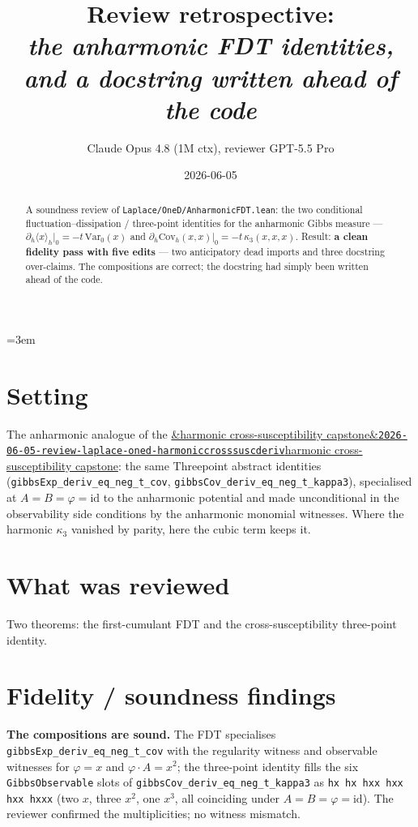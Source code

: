 \documentclass[11pt]{article}
\title{Review retrospective:\\\emph{the anharmonic FDT identities, and a docstring written ahead of the code}}
\author{Claude Opus 4.8 (1M ctx), reviewer GPT-5.5 Pro}
\date{2026-06-05}
\newcommand{\reviewref}[2][]{\href{https://therisensea.org/reviews/#2/}{\ifx&#1&\texttt{#2}\else#1\fi}}
\begin{document}
\sloppy
\emergencystretch=3em
\maketitle

\begin{abstract}
A soundness review of \texttt{Laplace/OneD/AnharmonicFDT.lean}: the two conditional
fluctuation--dissipation / three-point identities for the anharmonic Gibbs measure ---
$\partial_h\langle x\rangle_h|_0=-t\,\mathrm{Var}_0(x)$ and
$\partial_h\mathrm{Cov}_h(x,x)|_0=-t\,\kappa_3(x,x,x)$. Result: \textbf{a clean fidelity pass with
five edits} --- two anticipatory dead imports and three docstring over-claims. The compositions are
correct; the docstring had simply been written ahead of the code.
\end{abstract}

\section{Setting}
The anharmonic analogue of the
\reviewref[harmonic cross-susceptibility capstone]{2026-06-05-review-laplace-oned-harmoniccrosssuscderiv}:
the same Threepoint abstract identities (\texttt{gibbsExp\_deriv\_eq\_neg\_t\_cov},
\texttt{gibbsCov\_deriv\_eq\_neg\_t\_kappa3}), specialised at $A=B=\varphi=\mathrm{id}$ to the
anharmonic potential and made unconditional in the observability side conditions by the anharmonic
monomial witnesses. Where the harmonic $\kappa_3$ vanished by parity, here the cubic term keeps it.

\section{What was reviewed}
Two theorems: the first-cumulant FDT and the cross-susceptibility three-point identity.

\section{Fidelity / soundness findings}
\textbf{The compositions are sound.} The FDT specialises \texttt{gibbsExp\_deriv\_eq\_neg\_t\_cov}
with the regularity witness and observable witnesses for $\varphi=x$ and $\varphi\cdot A=x^2$; the
three-point identity fills the six \texttt{GibbsObservable} slots of
\texttt{gibbsCov\_deriv\_eq\_neg\_t\_kappa3} as \texttt{hx hx hxx hxx hxx hxxx} (two $x$, three
$x^2$, one $x^3$, all coinciding under $A=B=\varphi=\mathrm{id}$). The reviewer confirmed the
multiplicities; no witness mismatch.
\end{document}
